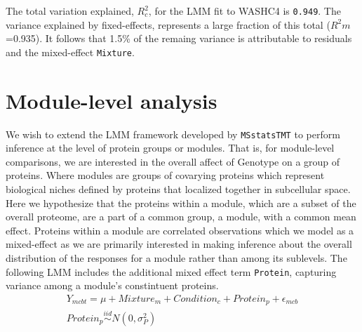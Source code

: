 \documentclass[11pt]{elife}
\begin{document}
\begin{knitrout}
\color{fgcolor}\begin{kframe}
\begin{alltt}
\end{alltt}
\end{kframe}
\end{knitrout}


The total variation explained, $R^2_{c}$, for the LMM fit to WASHC4 is 
\texttt{0.949}. The variance explained by fixed-effects, represents a large
fraction of this total ($R^2{m}$=0.935). It follows that 1.5\% of the remaing
variance is attributable to residuals and the mixed-effect \texttt{Mixture}.\\


\section{Module-level analysis}

We wish to extend the LMM framework developed by \texttt{MSstatsTMT} to perform 
inference at the level of protein groups or modules.
That is, for module-level comparisons, we are interested in the overall affect 
of Genotype on a group of proteins. Where modules are groups of covarying 
proteins which represent biological niches defined by proteins that 
localized together in subcellular space.\\

Here we hypothesize that the proteins within a module, which are a subset of the
overall proteome,  are a part of a common group, a module, with a common mean
effect. Proteins within a module are correlated observations which we model as a
mixed-effect as we are primarily interested in making inference about the
overall distribution of the responses for a module rather than among its
sublevels. The following LMM includes the additional mixed effect term
\texttt{Protein}, capturing variance among a module's constintuent proteins.\\

\begin{equation} 
  \begin{gathered}\label{eq:fx1} %
	Y_{mcbt} = \mu + Mixture_m + Condition_c + Protein_p + \epsilon_{mcb}\\
	Protein_p \stackrel{iid}{\sim} N(0,\sigma^2_P) \\
  \end{gathered}
\end{equation}
\end{document}
